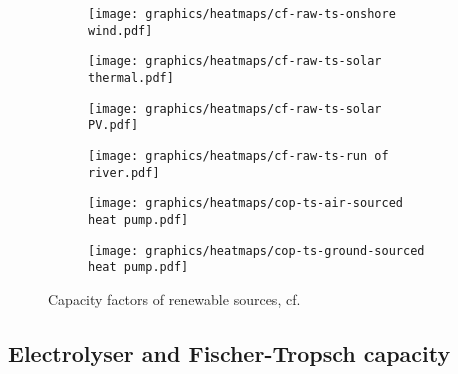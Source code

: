 



\clearpage
\begin{figure}
    \centering
        \begin{subfigure}[h]{0.49\textwidth}
            \centering
        \texttt{[image: graphics/heatmaps/cf-raw-ts-onshore wind.pdf]}
    \end{subfigure}
    \begin{subfigure}[h]{0.49\textwidth}
        \centering
        \texttt{[image: graphics/heatmaps/cf-raw-ts-solar thermal.pdf]}
    \end{subfigure}
    \begin{subfigure}[h]{0.49\textwidth}
        \centering
        \texttt{[image: graphics/heatmaps/cf-raw-ts-solar PV.pdf]}
    \end{subfigure}
    \begin{subfigure}[h]{0.49\textwidth}
        \centering
        \texttt{[image: graphics/heatmaps/cf-raw-ts-run of river.pdf]}
    \end{subfigure}
    \begin{subfigure}[h]{0.49\textwidth}
        \centering
        \texttt{[image: graphics/heatmaps/cop-ts-air-sourced heat pump.pdf]}
    \end{subfigure}
    \begin{subfigure}[h]{0.49\textwidth}
        \centering
        \texttt{[image: graphics/heatmaps/cop-ts-ground-sourced heat pump.pdf]}
    \end{subfigure}
    \caption{Capacity factors of renewable sources, cf. \cite{Neumann2022}}
    \label{fig:ren-cfs}
\end{figure}



\subsection{Electrolyser and Fischer-Tropsch capacity}


